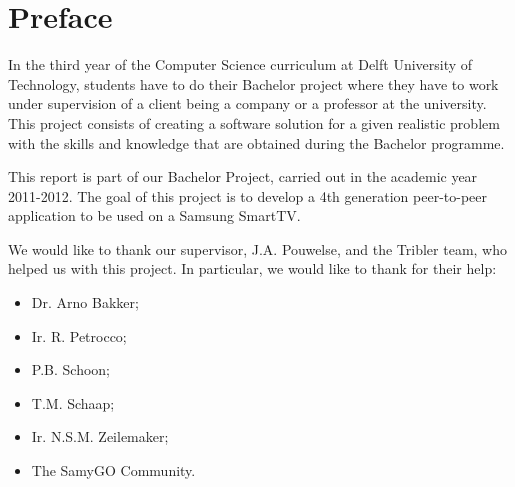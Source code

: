 \chapter*{Preface}
In the third year of the Computer Science curriculum at Delft University of Technology, students have to do their Bachelor project where they have to work under supervision of a client being a company or a professor at the university. This project consists of creating a software solution for a given realistic problem with the skills and knowledge that are obtained during the Bachelor programme.

This report is part of our Bachelor Project, carried out in the academic year 2011-2012. The goal of this project is to develop a 4th generation peer-to-peer application to be used on a Samsung SmartTV.

We would like to thank our supervisor, J.A. Pouwelse, and the Tribler team, who helped us with this project. In particular, we would like to thank for their help:

\begin{itemize}
\item Dr. Arno Bakker;
\item Ir. R. Petrocco;
\item P.B. Schoon;
\item T.M. Schaap;
\item Ir. N.S.M. Zeilemaker;
\item The SamyGO Community.

\end{itemize}
